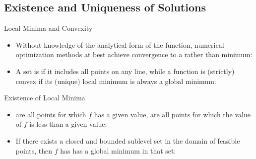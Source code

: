 \subsection{Existence and Uniqueness of Solutions}

\begin{frame}{Local Minima and Convexity}

\begin{itemize}
\item Without knowledge of the analytical form of the function, numerical optimization methods at best achieve convergence to a  rather than  minimum:


\item A set is  if it includes all points on any line, while a function is (strictly) convex if its (unique) local minimum is always a global minimum:


\end{itemize}

\end{frame}

\begin{frame}{Existence of Local Minima}

\begin{itemize}
\item {} are all points for which $f$ has a given value,  are all points for which the value of $f$ is less than a given value:

\lgcond{
\[L(z) = \{ \B x: f(\B x)=z\}\]
\[S(z) = \{ \B x: f(\B x)\leq z\}\]
}

\item If there exists a closed and bounded sublevel set in the domain of feasible points, then $f$ has has a global minimum in that set:


\end{itemize}


\end{frame}

